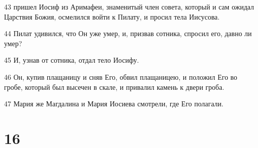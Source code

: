 \par 43 пришел Иосиф из Аримафеи, знаменитый член совета, который и сам ожидал Царствия Божия, осмелился войти к Пилату, и просил тела Иисусова.
\par 44 Пилат удивился, что Он уже умер, и, призвав сотника, спросил его, давно ли умер?
\par 45 И, узнав от сотника, отдал тело Иосифу.
\par 46 Он, купив плащаницу и сняв Его, обвил плащаницею, и положил Его во гробе, который был высечен в скале, и привалил камень к двери гроба.
\par 47 Мария же Магдалина и Мария Иосиева смотрели, где Его полагали.

\chapter{16}

